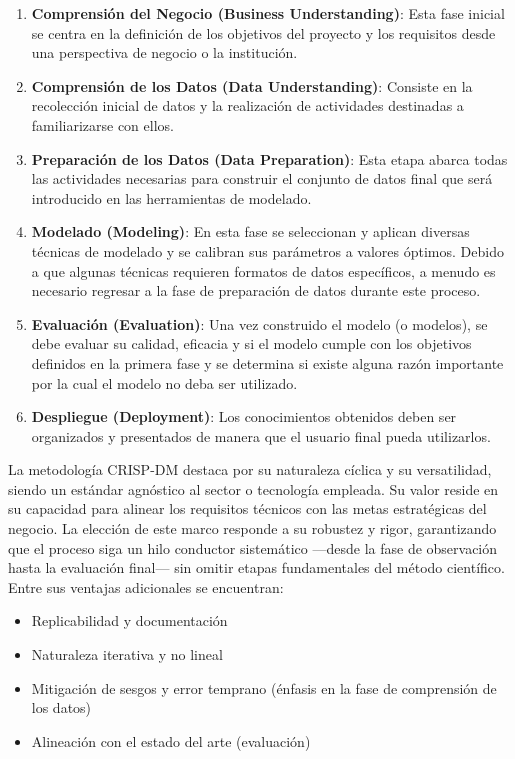 \documentclass[10pt, twocolumn]{article}
\begin{document}
\begin{enumerate}
  \item \textbf{Comprensión del Negocio (Business Understanding)}: Esta fase inicial se centra en la definición de los objetivos del proyecto y los requisitos desde una perspectiva de negocio o la institución.
  \item \textbf{Comprensión de los Datos (Data Understanding)}: Consiste en la recolección inicial de datos y la realización de actividades destinadas a familiarizarse con ellos.
  \item \textbf{Preparación de los Datos (Data Preparation)}: Esta etapa abarca todas las actividades necesarias para construir el conjunto de datos final que será introducido en las herramientas de modelado.
  \item \textbf{Modelado (Modeling)}: En esta fase se seleccionan y aplican diversas técnicas de modelado y se calibran sus parámetros a valores óptimos. Debido a que algunas técnicas requieren formatos de datos específicos, a menudo es necesario regresar a la fase de preparación de datos durante este proceso.
  \item \textbf{Evaluación (Evaluation)}: Una vez construido el modelo (o modelos), se debe evaluar su calidad, eficacia y si el modelo cumple con los objetivos definidos en la primera fase y se determina si existe alguna razón importante por la cual el modelo no deba ser utilizado.
  \item \textbf{Despliegue (Deployment)}: Los conocimientos obtenidos deben ser organizados y presentados de manera que el usuario final pueda utilizarlos.
\end{enumerate}

La metodología CRISP-DM destaca por su naturaleza cíclica y su versatilidad, siendo un estándar agnóstico al sector o tecnología empleada. Su valor reside en su capacidad para alinear los requisitos técnicos con las metas estratégicas del negocio. La elección de este marco responde a su robustez y rigor, garantizando que el proceso siga un hilo conductor sistemático —desde la fase de observación hasta la evaluación final— sin omitir etapas fundamentales del método científico. Entre sus ventajas adicionales se encuentran:

\begin{itemize}
  \item Replicabilidad y documentación
  \item Naturaleza iterativa y no lineal
  \item Mitigación de sesgos y error temprano (énfasis en la fase de comprensión de los datos)
  \item Alineación con el estado del arte (evaluación)
\end{itemize}
\end{document}

